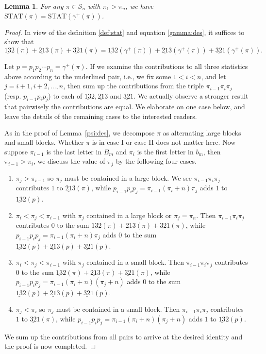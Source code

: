 \documentclass[12pt]{amsart}
\numberwithin{equation}{section}
\theoremstyle{plain}
\newtheorem{lemma}[theorem]{Lemma}
\theoremstyle{definition}
\def\STAT{\mathrm{STAT}}
\def\SS{\mathcal{S}}
\begin{document}
\begin{lemma}\label{gamma:stat}
For any $\pi\in\SS_n$ with $\pi_1>\pi_n$, we have $\STAT(\pi)=\STAT(\gamma^+(\pi))$.
\end{lemma}
\begin{proof}
In view of the definition \eqref{def:stat} and equation \eqref{gamma:des}, it suffices to show that
$$\underline{13}2(\pi)+\underline{21}3(\pi)+\underline{32}1(\pi)=\underline{13}2(\gamma^+(\pi))+\underline{21}3(\gamma^+(\pi))+\underline{32}1(\gamma^+(\pi)).$$

Let $p=p_1p_2\cdots p_n=\gamma^+(\pi)$. If we examine the contributions to all three statistics above according to the underlined pair, i.e., we fix some $1<i< n$, and let $j=i+1,i+2,\ldots,n$, then sum up the contributions from the triple $\pi_{i-1}\pi_i\pi_j$ (resp. $p_{i-1}p_ip_j$) to each of $\underline{13}2,\underline{21}3$ and $\underline{32}1$. We actually observe a stronger result that pairwisely the contributions are equal. We elaborate on one case below, and leave the details of the remaining cases to the interested readers.

As in the proof of Lemma~\ref{psi:des}, we decompose $\pi$ as alternating large blocks and small blocks. Whether $\pi$ is in case I or case II does not matter here. Now suppose $\pi_{i-1}$ is the last letter in $B_m$ and $\pi_i$ is the first letter in $b_m$, then $\pi_{i-1}>\pi_i$, we discuss the value of $\pi_j$ by the following four cases.
\begin{enumerate}[i]
	\item $\pi_j>\pi_{i-1}$ so $\pi_j$ must be contained in a large block. We see $\pi_{i-1}\pi_i\pi_j$ contributes $1$ to $\underline{21}3(\pi)$, while $p_{i-1}p_ip_j=\pi_{i-1}(\pi_i+n)\pi_j$ adds $1$ to $\underline{13}2(p)$.
	\item $\pi_i<\pi_j<\pi_{i-1}$ with $\pi_j$ contained in a large block or $\pi_j=\pi_n$. Then $\pi_{i-1}\pi_i\pi_j$ contributes $0$ to the sum $\underline{13}2(\pi)+\underline{21}3(\pi)+\underline{32}1(\pi)$, while $p_{i-1}p_ip_j=\pi_{i-1}(\pi_i+n)\pi_j$ adds $0$ to the sum $\underline{13}2(p)+\underline{21}3(p)+\underline{32}1(p)$.
	\item $\pi_i<\pi_j<\pi_{i-1}$ with $\pi_j$ contained in a small block. Then $\pi_{i-1}\pi_i\pi_j$ contributes $0$ to the sum $\underline{13}2(\pi)+\underline{21}3(\pi)+\underline{32}1(\pi)$, while $p_{i-1}p_ip_j=\pi_{i-1}(\pi_i+n)(\pi_j+n)$ adds $0$ to the sum $\underline{13}2(p)+\underline{21}3(p)+\underline{32}1(p)$.
	\item $\pi_j<\pi_i$ so $\pi_j$ must be contained in a small block. Then $\pi_{i-1}\pi_i\pi_j$ contributes $1$ to $\underline{32}1(\pi)$, while $p_{i-1}p_ip_j=\pi_{i-1}(\pi_i+n)(\pi_j+n)$ adds $1$ to $\underline{13}2(p)$.
\end{enumerate}

We sum up the contributions from all pairs to arrive at the desired identity and the proof is now completed.
\end{proof}
\end{document}
